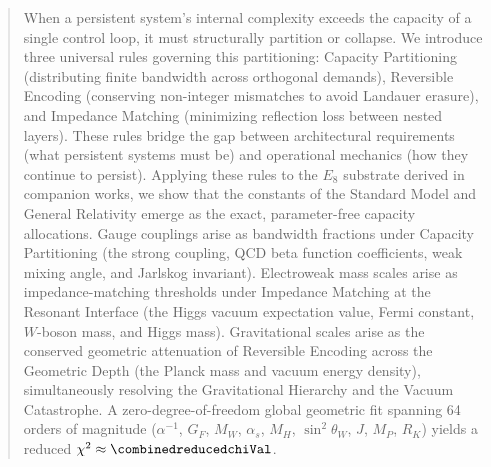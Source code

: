 
\begin{abstract}
When a persistent system's internal complexity exceeds the capacity of a single control loop, it must structurally partition or collapse. We introduce three universal rules governing this partitioning: Capacity Partitioning (distributing finite bandwidth across orthogonal demands), Reversible Encoding (conserving non-integer mismatches to avoid Landauer erasure), and Impedance Matching (minimizing reflection loss between nested layers). These rules bridge the gap between architectural requirements (what persistent systems must be) and operational mechanics (how they continue to persist). Applying these rules to the $E_8$ substrate derived in companion works, we show that the constants of the Standard Model and General Relativity emerge as the exact, parameter-free capacity allocations. Gauge couplings arise as bandwidth fractions under Capacity Partitioning (the strong coupling, QCD beta function coefficients, weak mixing angle, and Jarlskog invariant). Electroweak mass scales arise as impedance-matching thresholds under Impedance Matching at the Resonant Interface (the Higgs vacuum expectation value, Fermi constant, $W$-boson mass, and Higgs mass). Gravitational scales arise as the conserved geometric attenuation of Reversible Encoding across the Geometric Depth (the Planck mass and vacuum energy density), simultaneously resolving the Gravitational Hierarchy and the Vacuum Catastrophe. A zero-degree-of-freedom global geometric fit spanning 64 orders of magnitude ($\alpha^{-1}$, $G_F$, $M_W$, $\alpha_s$, $M_H$, $\sin^2\theta_W$, $J$, $M_P$, $R_K$) yields a reduced $\chi^2 \approx \combinedreducedchiVal$.
\end{abstract}